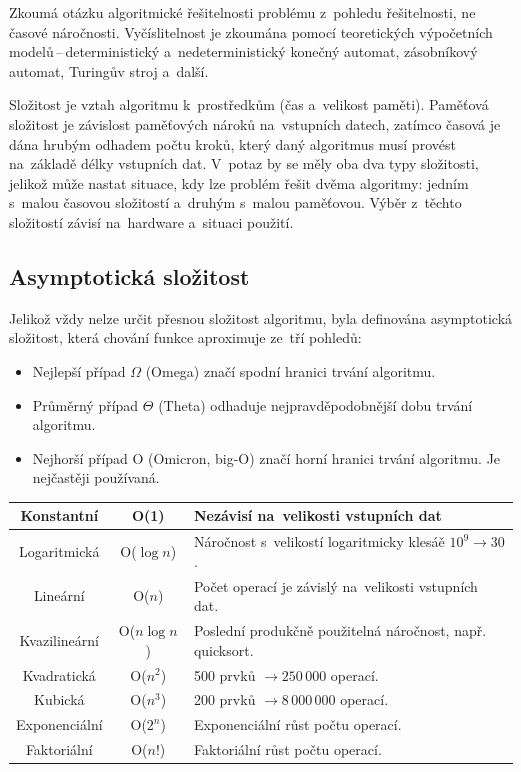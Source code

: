 Zkoumá otázku algoritmické řešitelnosti problému z~pohledu řešitelnosti, ne časové náročnosti. Vyčíslitelnost je zkoumána pomocí teoretických výpočetních modelů\,--\,deterministický a~nedeterministický konečný automat, zásobníkový automat, Turingův stroj a~další.

Složitost je vztah algoritmu k~prostředkům (čas a~velikost paměti). Paměťová složitost je závislost paměťových nároků na~vstupních datech, zatímco časová je dána hrubým odhadem počtu kroků, který daný algoritmus musí provést na~základě délky vstupních dat. V~potaz by se měly oba dva typy složitosti, jelikož může nastat situace, kdy lze problém řešit dvěma algoritmy: jedním s~malou časovou složitostí a~druhým s~malou paměťovou. Výběr z~těchto složitostí závisí na~hardware a~situaci použití.

\subsection{Asymptotická složitost}

Jelikož vždy nelze určit přesnou složitost algoritmu, byla definována asymptotická složitost, která chování funkce aproximuje ze~tří pohledů:

\begin{itemize}
	\item Nejlepší případ $\Omega$ (Omega) značí spodní hranici trvání algoritmu.
	\item Průměrný případ $\Theta$ (Theta) odhaduje nejpravděpodobnější dobu trvání algoritmu.
	\item Nejhorší případ O (Omicron, big-O) značí horní hranici trvání algoritmu. Je nejčastěji používaná.
\end{itemize}

\begin{table}[h]
	\begin{tabularx}{\textwidth}{|c|c|X|}\hline
		Konstantní    & O(1)          & Nezávisí na~velikosti vstupních dat \\\hline
		Logaritmická  & O($\log{n}$)  & Náročnost s~velikostí logaritmicky klesáě $10^9 \rightarrow 30$. \\\hline
		Lineární      & O($n$)        & Počet operací je závislý na~velikosti vstupních dat. \\\hline
		Kvazilineární & O($n\log{n}$) & Poslední produkčně použitelná náročnost, např. quicksort. \\\hline
		Kvadratická   & O($n^2$)      & 500 prvků $\rightarrow 250\,000$ operací. \\\hline
		Kubická       & O($n^3$)      & 200 prvků $\rightarrow 8\,000\,000$ operací. \\\hline
		Exponenciální & O($2^n$)      & Exponenciální růst počtu operací. \\\hline
		Faktoriální   & O($n!$)       & Faktoriální růst počtu operací. \\\hline
	\end{tabularx}
\end{table}

